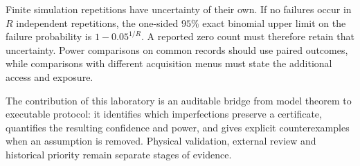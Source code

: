Finite simulation repetitions have uncertainty of their own. If no failures
occur in $R$ independent repetitions, the one-sided $95\%$ exact binomial upper
limit on the failure probability is $1-0.05^{1/R}$. A reported zero count must
therefore retain that uncertainty. Power comparisons on common records should
use paired outcomes, while comparisons with different acquisition menus must
state the additional access and exposure.

The contribution of this laboratory is an auditable bridge from model theorem
to executable protocol: it identifies which imperfections preserve a
certificate, quantifies the resulting confidence and power, and gives explicit
counterexamples when an assumption is removed. Physical validation, external
review and historical priority remain separate stages of evidence.
